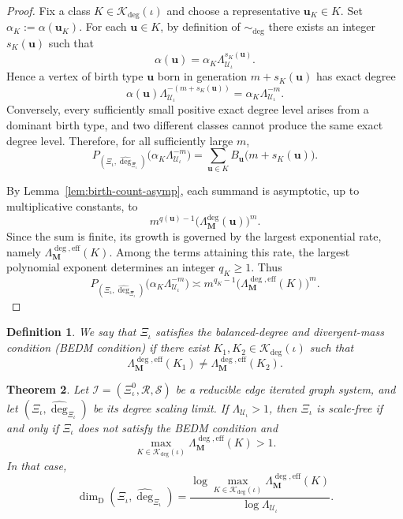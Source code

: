 \documentclass[12pt]{iopart}
\newtheorem{theorem}{Theorem}[section]
\newtheorem{definition}[theorem]{Definition}
\newcommand*{\dimdeg}{\dim_\mathrm{D}}
\begin{document}
\begin{proof}
Fix a class $K\in\mathscr K_{\deg}(\iota)$ and choose a representative $\mathbf u_K\in K$.
Set $\alpha_K:=\alpha(\mathbf u_K)$.
For each $\mathbf u\in K$, by definition of $\sim_{\deg}$ there exists an integer $s_K(\mathbf u)$ such that
\[
\alpha(\mathbf u)
=
\alpha_K\Lambda_{\mathcal U_\iota}^{s_K(\mathbf u)}.
\]
Hence a vertex of birth type $\mathbf u$ born in generation $m+s_K(\mathbf u)$ has exact degree
\[
\alpha(\mathbf u)\Lambda_{\mathcal U_\iota}^{-(m+s_K(\mathbf u))}
=
\alpha_K\Lambda_{\mathcal U_\iota}^{-m}.
\]
Conversely, every sufficiently small positive exact degree level arises from a dominant birth type, and two different classes cannot produce the same exact degree level.
Therefore, for all sufficiently large $m$,
\[
P_{(\Xi_\iota,\hat{\deg}_{\Xi_\iota})}
\big(\alpha_K\Lambda_{\mathcal U_\iota}^{-m}\big)
=
\sum_{\mathbf u\in K}
B_{\mathbf u}\big(m+s_K(\mathbf u)\big).
\]

By Lemma~\ref{lem:birth-count-asymp}, each summand is asymptotic, up to multiplicative constants, to
\[
m^{q(\mathbf u)-1}
\big(\Lambda_{\mathbf M}^{\deg}(\mathbf u)\big)^m.
\]
Since the sum is finite, its growth is governed by the largest exponential rate, namely
$\Lambda_{\mathbf M}^{\deg,\mathrm{eff}}(K)$.
Among the terms attaining this rate, the largest polynomial exponent determines an integer $q_K\ge 1$.
Thus
\[
P_{(\Xi_\iota,\hat{\deg}_{\Xi_\iota})}
\big(\alpha_K\Lambda_{\mathcal U_\iota}^{-m}\big)
\asymp
m^{q_K-1}
\big(\Lambda_{\mathbf M}^{\deg,\mathrm{eff}}(K)\big)^m.
\]
\end{proof}

\begin{definition}\label{def:BEDM}
We say that $\Xi_\iota$ satisfies the \emph{balanced-degree and divergent-mass condition}
(\emph{BEDM} condition) if there exist
$K_1,K_2\in\mathscr K_{\deg}(\iota)$ such that
\[
\Lambda_{\mathbf M}^{\deg,\mathrm{eff}}(K_1)
\ne
\Lambda_{\mathbf M}^{\deg,\mathrm{eff}}(K_2).
\]
\end{definition}

\begin{theorem}\label{thm:singlescalefree}
Let $\mathscr I=(\Xi_\iota^0,\mathcal R,\mathcal S)$ be a reducible edge iterated graph system, and let
$(\Xi_\iota,\hat{\deg}_{\Xi_\iota})$ be its degree scaling limit.
If $\Lambda_{\mathcal U_\iota}>1$, then $\Xi_\iota$ is scale-free if and only if $\Xi_\iota$ does not satisfy the BEDM condition and
\[
\max_{K\in\mathscr K_{\deg}(\iota)}
\Lambda_{\mathbf M}^{\deg,\mathrm{eff}}(K)
>1.
\]
In that case,
\[
\dimdeg(\Xi_\iota,\hat{\deg}_{\Xi_\iota})
=
\frac{
\log \displaystyle\max_{K\in\mathscr K_{\deg}(\iota)}
\Lambda_{\mathbf M}^{\deg,\mathrm{eff}}(K)
}{
\log \Lambda_{\mathcal U_\iota}
}.
\]
\end{theorem}
\end{document}
